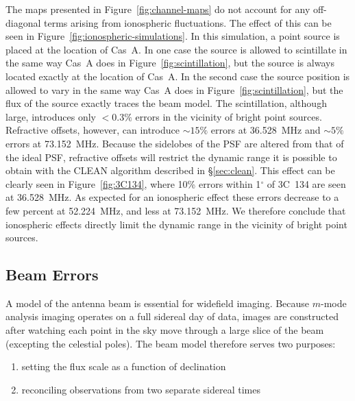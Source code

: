 \documentclass[twocolumn]{aastex61}
\begin{document}
The maps presented in Figure~\ref{fig:channel-maps} do not account for any off-diagonal terms
arising from ionospheric fluctuations. The effect of this can be seen in
Figure~\ref{fig:ionospheric-simulations}. In this simulation, a point source is placed at the
location of Cas~A. In one case the source is allowed to scintillate in the same way Cas~A does in
Figure~\ref{fig:scintillation}, but the source is always located exactly at the location of Cas~A.
In the second case the source position is allowed to vary in the same way Cas~A does in
Figure~\ref{fig:scintillation}, but the flux of the source exactly traces the beam model. The
scintillation, although large, introduces only $<0.3\%$ errors in the vicinity of bright point
sources. Refractive offsets, however, can introduce $\sim 15\%$ errors at 36.528~MHz and $\sim 5\%$
errors at 73.152~MHz.  Because the sidelobes of the PSF are altered from that of the ideal PSF,
refractive offsets will restrict the dynamic range it is possible to obtain with the CLEAN algorithm
described in \S\ref{sec:clean}. This effect can be clearly seen in Figure~\ref{fig:3C134}, where
10\% errors within 1$^\circ$ of 3C~134 are seen at 36.528~MHz.  As expected for an ionospheric
effect these errors decrease to a few percent at 52.224~MHz, and less at 73.152~MHz. We therefore
conclude that ionospheric effects directly limit the dynamic range in the vicinity of bright point
sources.

\subsection{Beam Errors}

A model of the antenna beam is essential for widefield imaging. Because $m$-mode analysis imaging
operates on a full sidereal day of data, images are constructed after watching each point in the sky
move through a large slice of the beam (excepting the celestial poles). The beam model therefore
serves two purposes:
\begin{enumerate}
    \item setting the flux scale as a function of declination
    \item reconciling observations from two separate sidereal times
\end{enumerate}
\end{document}
